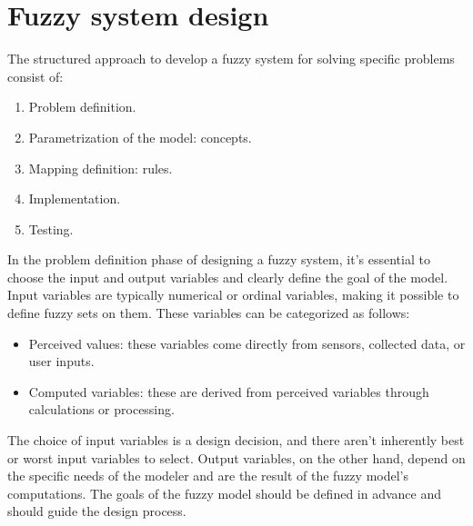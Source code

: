 \section{Fuzzy system design}

The structured approach to develop a fuzzy system for solving specific problems consist of: 
\begin{enumerate}
    \item Problem definition.
    \item Parametrization of the model: concepts.
    \item Mapping definition: rules.
    \item Implementation.
    \item Testing.
\end{enumerate}
In the problem definition phase of designing a fuzzy system, it's essential to choose the input and output variables and clearly define the goal of the model. 
Input variables are typically numerical or ordinal variables, making it possible to define fuzzy sets on them. 
These variables can be categorized as follows:

\begin{itemize}
    \item Perceived values: these variables come directly from sensors, collected data, or user inputs.
    \item Computed variables: these are derived from perceived variables through calculations or processing.
\end{itemize}
The choice of input variables is a design decision, and there aren't inherently best or worst input variables to select. 
Output variables, on the other hand, depend on the specific needs of the modeler and are the result of the fuzzy model's computations. 
The goals of the fuzzy model should be defined in advance and should guide the design process.

